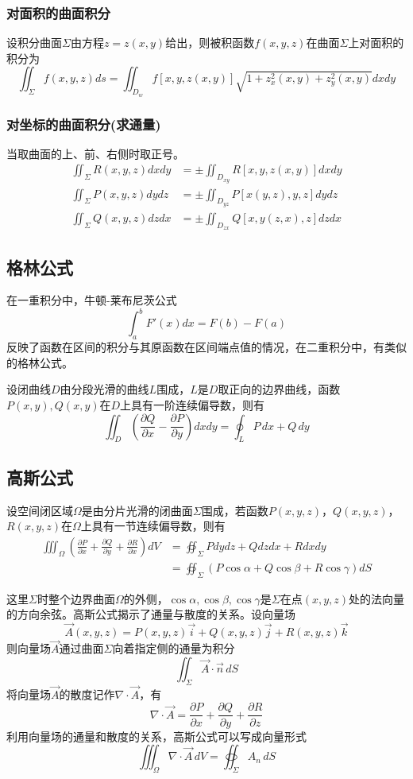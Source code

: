 \documentclass[a4paper,zihao=-4,UTF8]{ctexbook}
\begin{document}
\subsubsection{对面积的曲面积分}
设积分曲面$\Sigma$由方程$z=z(x,y)$给出，则被积函数$f(x,y,z)$在曲面$\Sigma$上对面积的积分为
\[\iint_{\Sigma} f(x, y, z) d s=\iint_{D_{w}} f[x, y, z(x, y)] \sqrt{1+z_{x}^{2}(x, y)+z_{y}^{2}(x, y)} d x d y\]
\subsubsection[对坐标的曲面积分]{对坐标的曲面积分(求通量)}
当取曲面的上、前、右侧时取正号。
\begin{align*}
    \iint_{\Sigma} R(x, y, z) d x d y &=\pm \iint_{D_{xy}} R[x, y, z(x, y)] d x d y \\ 
    \iint_{\Sigma} P(x, y, z) d y d z &=\pm \iint_{D_{yz}} P[x(y, z), y, z] d y d z \\ 
    \iint_{\Sigma} Q(x, y, z) d z d x &=\pm \iint_{D_{zx}} Q[x, y(z, x), z] d z d x
\end{align*}
\subsection{格林公式}
在一重积分中，牛顿-莱布尼茨公式
\[\int_a^b F'(x)dx=F(b)-F(a)\]
反映了函数在区间的积分与其原函数在区间端点值的情况，在二重积分中，有类似的格林公式。

设闭曲线$D$由分段光滑的曲线$L$围成，$L$是$D$取正向的边界曲线，函数$P(x,y),Q(x,y)$在$D$上具有一阶连续偏导数，则有
\[\iint_D\left(\frac{\partial Q}{\partial x}-\frac{\partial P}{\partial y}\right)dxdy=\oint_LP\,dx+Q\,dy\]
\subsection{高斯公式}
设空间闭区域$\Omega$是由分片光滑的闭曲面$\Sigma$围成，若函数$P(x,y,z)$，$Q(x,y,z)$，$R(x,y,z)$在$\Omega$上具有一节连续偏导数，则有
\begin{align*}
    \iiint_\Omega\left(\frac{\partial P}{\partial x}+\frac{\partial Q}{\partial y}+\frac{\partial R}{\partial x}\right)dV &=\oiint_\Sigma Pdydz+Qdzdx+Rdxdy\\
    &=\oiint_\Sigma \left(P\cos\alpha+Q\cos\beta+R\cos\gamma\right)dS
\end{align*}

这里$\Sigma$时整个边界曲面$\Omega$的外侧，$\cos\alpha,\cos\beta,\cos\gamma$是$\Sigma$在点$(x,y,z)$处的法向量的方向余弦。高斯公式揭示了通量与散度的关系。设向量场
\[\vec{A}(x,y,z)=P(x,y,z)\vec{i}+Q(x,y,z)\vec{j}+R(x,y,z)\vec{k}\]
则向量场$\vec{A}$通过曲面$\Sigma$向着指定侧的通量为积分
\[\iint_\Sigma\vec{A}\cdot\vec{n}\,dS\]
将向量场$\vec{A}$的散度记作$\nabla\cdot \vec{A}$，有
\[\nabla\cdot\vec{A}=\frac{\partial P}{\partial x}+\frac{\partial Q}{\partial y}+\frac{\partial R}{\partial z}\]
利用向量场的通量和散度的关系，高斯公式可以写成向量形式
\[\iiint_\Omega\nabla\cdot\vec{A}\,dV=\oiint_\Sigma A_n\,dS\]
\end{document}
